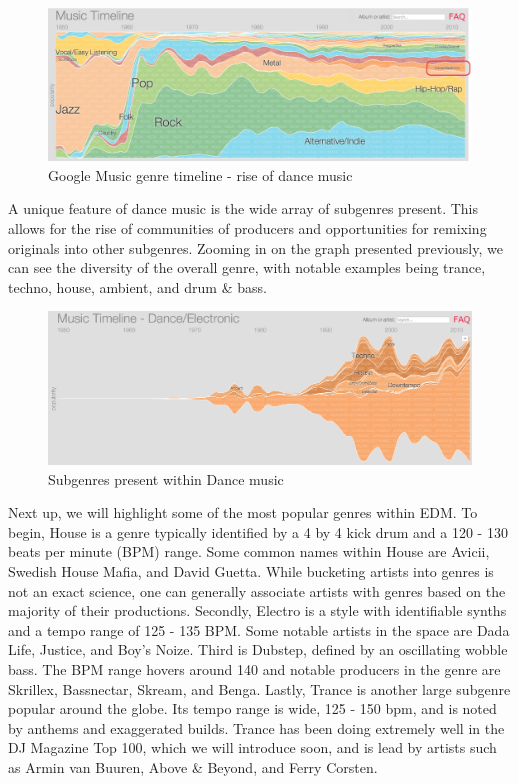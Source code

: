 \documentclass[12pt]{dalcsthesis}
\begin{document}
\begin{figure}[h]
\includegraphics[scale=.49]{genre_graph}
\centering
\caption{Google Music genre timeline - rise of dance music}
\end{figure}


A unique feature of dance music is the wide array of subgenres present. This allows for the rise of communities of producers and opportunities for remixing originals into other subgenres. Zooming in on the graph presented previously, we can see the diversity of the overall genre, with notable examples being trance, techno, house, ambient, and drum \& bass. \newpage

\begin{figure}[h]
\includegraphics[scale=.65]{subgenre_graph}
\centering
\caption{Subgenres present within Dance music}
\end{figure}

Next up, we will highlight some of the most popular genres within EDM. To begin, House is a genre typically identified by a 4 by 4 kick drum and a 120 - 130 beats per minute (BPM) range. Some common names within House are Avicii, Swedish House Mafia, and David Guetta. While bucketing artists into genres is not an exact science, one can generally associate artists with  genres based on the majority of their productions. Secondly, Electro is a style with identifiable synths and a tempo range of 125 - 135 BPM. Some notable artists in the space are Dada Life, Justice, and Boy's Noize. Third is Dubstep, defined by an oscillating wobble bass. The BPM range hovers around 140 and notable producers in the genre are Skrillex, Bassnectar, Skream, and Benga. Lastly, Trance is another large subgenre popular around the globe. Its tempo range is wide, 125 - 150 bpm, and is noted by anthems and exaggerated builds. Trance has been doing extremely well in the DJ Magazine Top 100, which we will introduce soon, and is lead by artists such as Armin van Buuren, Above \& Beyond, and Ferry Corsten.
\end{document}

